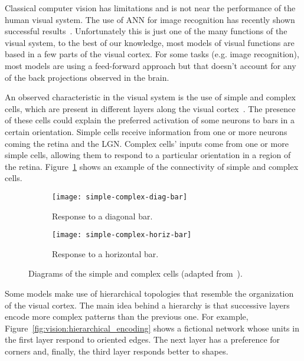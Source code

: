 Classical computer vision has limitations and is not near the performance of the human visual system. The use of ANN for image recognition has recently shown successful results~\cite{krizhevsky2012imagenet}. Unfortunately this is just one of the many functions of the visual system, to the best of our knowledge, most models of visual functions are based in a few parts of the visual cortex. For some tasks (e.g. image recognition), most models are using a feed-forward approach but that doesn't account for any of the back projections observed in the brain.

An observed characteristic in the visual system is the use of simple and complex cells, which are present in different layers along the visual cortex~\cite{hubel1962receptive,thompson2000brain}. The presence of these cells could explain the preferred activation of some neurons to bars in a certain orientation. Simple cells receive information from one or more neurons coming the retina and the LGN. Complex cells' inputs come from one or more simple cells, allowing them to respond to a particular orientation in a region of the retina. Figure~\ref{fig:vision:simple-complex} shows an example of the connectivity of simple and complex cells.

\begin{figure}[h]
  \begin{center}
    \begin{subfigure}[t]{0.4\textwidth}
      \texttt{[image: simple-complex-diag-bar]}
      \caption{Response to a diagonal bar.}
    \end{subfigure}
    \begin{subfigure}[t]{0.4\textwidth}
      \texttt{[image: simple-complex-horiz-bar]}
      \caption{Response to a horizontal bar.}
    \end{subfigure}
    \caption{Diagrams of the simple and complex cells (adapted from~\cite{wikipedia-images}). }
    \label{fig:vision:simple-complex}
  \end{center}
\end{figure}

Some models make use of hierarchical topologies that resemble the organization of the visual cortex. The main idea behind a hierarchy is that successive layers encode more complex patterns than the previous one. For example, Figure~\ref{fig:vision:hierarchical_encoding} shows a fictional network whose units in the first layer respond to oriented edges. The next layer has a preference for corners and, finally, the third layer responds better to shapes.

